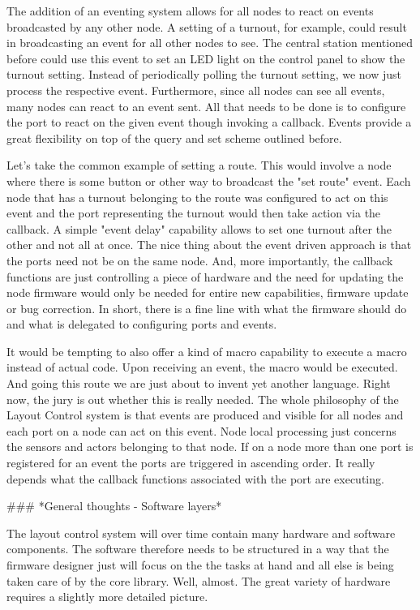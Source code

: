 The addition of an eventing system allows for all nodes to react on events broadcasted by any other node. A setting of a turnout, for example, could result in broadcasting an event for all other nodes to see. The central station mentioned before could use this event to set an LED light on the control panel to show the turnout setting. Instead of periodically polling the turnout setting, we now just process the respective event. Furthermore, since all nodes can see all events, many nodes can react to an event sent. All that needs to be done is to configure the port to react on the given event though invoking a callback. Events provide a great flexibility on top of the query and set scheme outlined before.

Let's take the common example of setting a route. This would involve a node where there is some button or other way to broadcast the "set route" event. Each node that has a turnout belonging to the route was configured to act on this event and the port representing the turnout would then take action via the callback. A simple "event delay" capability allows to set one turnout after the other and not all at once. The nice thing about the event driven approach is that the ports need not be on the same node. And, more importantly, the callback functions are just controlling a piece of hardware and the need for updating the node firmware would only be needed for entire new capabilities, firmware update or bug correction. In short, there is a fine line with what the firmware should do and what is delegated to configuring ports and events.

It would be tempting to also offer a kind of macro capability to execute a macro instead of actual code. Upon receiving an event, the macro would be executed. And going this route we are just about to invent yet another language. Right now, the jury is out whether this is really needed. The whole philosophy of the Layout Control system is that events are produced and visible for all nodes and each port on a node can act on this event. Node local processing just concerns the sensors and actors belonging to that node. If on a node more than one port is registered for an event the ports are triggered in ascending order. It really depends what the callback functions associated with the port are executing.

### *General thoughts - Software layers*

The layout control system will over time contain many hardware and software components. The software therefore needs to be structured in a way that the firmware designer just will focus on the the tasks at hand and all else is being taken care of by the core library. Well, almost. The great variety of hardware requires a slightly more detailed picture.

